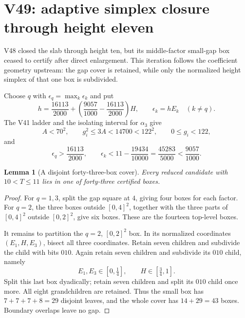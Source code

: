 \documentclass[11pt]{article}
\newtheorem{lemma}[theorem]{Lemma}
\theoremstyle{definition}
\theoremstyle{remark}
\begin{document}
\clearpage
\section{V49: adaptive simplex closure through height eleven}
\label{sec:f2v49-ten-eleven}
\begingroup
\setcounter{equation}{0}
\renewcommand{\theequation}{N49.\arabic{equation}}
\renewcommand{\theHequation}{f2v49.\arabic{equation}}

V48 closed the slab through height ten, but its middle-factor small-gap box
ceased to certify after direct enlargement.  This iteration follows the
coefficient geometry upstream: the gap cover is retained, while only the
normalized height simplex of that one box is subdivided.

Choose \(q\) with \(\epsilon_q=\max_k\epsilon_k\) and put
\begin{equation}
 h=\frac{16113}{2000}
   +\left(\frac{9057}{1000}-\frac{16113}{2000}\right)H,
 \qquad \epsilon_k=hE_k\quad(k\ne q).
 \label{eq:f2v49-height}
\end{equation}
The V41 ladder and the isolating interval for \(\alpha_3\) give
\begin{equation}
 A<70^2,\qquad
 g_i^2\le3A<14700<122^2,\qquad 0\le g_i<122,
 \label{eq:f2v49-gap}
\end{equation}
and
\[
 \epsilon_q>\frac{16113}{2000},\qquad
 \epsilon_k<11-\frac{19434}{10000}
 =\frac{45283}{5000}<\frac{9057}{1000}.
\]

\begin{lemma}[A disjoint forty-three-box cover]
\label{lem:f2v49-cover}
Every reduced candidate with \(10<T\le11\) lies in one of forty-three
certified boxes.
\end{lemma}

\begin{proof}
For \(q=1,3\), split the gap square at \(4\), giving four boxes for each
factor.  For \(q=2\), the three boxes outside \([0,4]^2\), together with
the three parts of \([0,4]^2\) outside \([0,2]^2\), give six boxes.
These are the fourteen top-level boxes.

It remains to partition the \(q=2\), \([0,2]^2\) box.  In its normalized
coordinates \((E_1,H,E_3)\), bisect all three coordinates.  Retain seven
children and subdivide the child with bits \(010\).  Again retain seven
children and subdivide its \(010\) child, namely
\[
 E_1,E_3\in[0,\tfrac14],\qquad H\in[\tfrac34,1].
\]
Split this last box dyadically; retain seven children and split its \(010\)
child once more.  All eight grandchildren are retained.  Thus the small
box has \(7+7+7+8=29\) disjoint leaves, and the whole cover has
\(14+29=43\) boxes.  Boundary overlaps leave no gap.
\end{proof}
\end{document}
